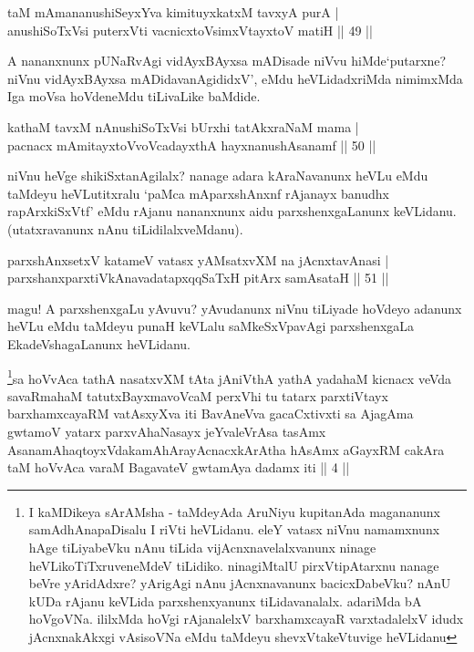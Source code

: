 
\begin{shl}
taM mAmananushiSeyxYva kimituyxkatxM tavxyA purA | \\
anushiSoTxV\s si puterxVti vacnicxtoV\s simxVtayxtoV matiH \hfill|| 49 || 
\end{shl}

\begin{artha}
A nananxnunx pUNaRvAgi vidAyxBAyxsa mADisade niVvu hiMde`putarxne? 
niVnu vidAyxBAyxsa mADidavanAgididxV', eMdu heVLidadxriMda nimimxMda 
Iga moVsa hoVdeneMdu tiLivaLike baMdide.
\end{artha}

\begin{shl}
kathaM tavxM nAnushiSoTxV\s si bUrxhi tatAkxraNaM mama | \\
pacnacx mAmitayxtoV\s voVcadayxthA hayxnanushAsanamf \hfill|| 50 || 
\end{shl}

\begin{artha}
niVnu heVge shikiSxtanAgilalx? nanage adara kAraNavanunx heVLu eMdu 
taMdeyu heVLutitxralu `paMca mAparxshAnxnf rAjanayx banudhx 
rapArxkiSxVtf' eMdu rAjanu nananxnunx aidu parxshenxgaLanunx 
keVLidanu. (utatxravanunx nAnu tiLidilalxveMdanu).
\end{artha}

\begin{shl}
parxshAnxsetxV katameV vatasx yAMsatxvXM na jAcnxtavAnasi | \\
parxshanxparxtiVkAnavadatapxqqSaTxH pitArx samAsataH \hfill|| 51 || 
\end{shl}

\begin{artha}
magu! A parxshenxgaLu yAvuvu? yAvudanunx niVnu tiLiyade hoVdeyo 
adanunx heVLu eMdu taMdeyu punaH keVLalu saMkeSxVpavAgi parxshenxgaLa 
EkadeVshagaLanunx heVLidanu.
\end{artha}


\begin{kandikeshl}
\footnote{I kaMDikeya sArAMsha - taMdeyAda AruNiyu kupitanAda  magananunx samAdhAnapaDisalu I riVti heVLidanu. eleY vatasx niVnu  namamxnunx hAge tiLiyabeVku nAnu tiLida vijAcnxnavelalxvanunx ninage  heVLikoTiTxruveneMdeV tiLidiko. ninagiMtalU pirxVtipAtarxnu nanage  beVre yAridAdxre? yArigAgi nAnu jAcnxnavanunx bacicxDabeVku? nAnU kUDa  rAjanu keVLida parxshenxyanunx tiLidavanalalx. adariMda bA hoVgoVNa.  ililxMda hoVgi rAjanalelxV barxhamxcayaR varxtadalelxV idudx  jAcnxnakAkxgi vAsisoVNa eMdu taMdeyu shevxVtakeVtuvige heVLidanu \ndash }sa hoVvAca tathA nasatxvXM tAta jAniVthA yathA yadahaM kicnacx veVda savaRmahaM tatutxBayxmavoVcaM perxVhi tu tatarx parxtiVtayx barxhamxcayaRM vatAsxyXva iti BavAneVva gacaCxtivxti sa AjagAma gwtamoV yatarx parxvAhaNasayx jeYvaleVrAsa tasAmx AsanamAhaqtoyxVdakamAhArayAcnacxkArAtha hAsAmx aGayxRM cakAra taM hoVvAca varaM BagavateV gwtamAya dadamx iti || 4 ||
\end{kandikeshl}

